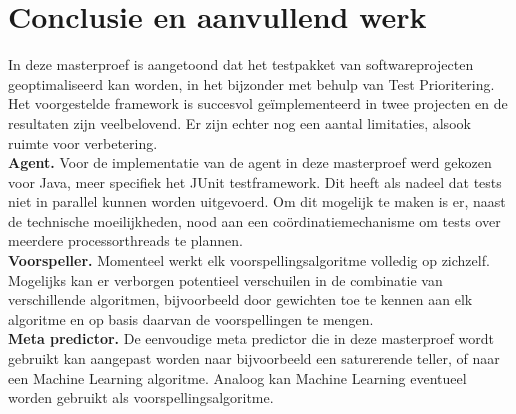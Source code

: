 \section{Conclusie en aanvullend werk}
\noindent In deze masterproef is aangetoond dat het testpakket van softwareprojecten geoptimaliseerd kan worden, in het bijzonder met behulp van Test Prioritering. Het voorgestelde framework is succesvol ge\"implementeerd in twee projecten en de resultaten zijn veelbelovend. Er zijn echter nog een aantal limitaties, alsook ruimte voor verbetering.\\

\noindent \textbf{Agent.}
Voor de implementatie van de agent in deze masterproef werd gekozen voor Java, meer specifiek het JUnit testframework. Dit heeft als nadeel dat tests niet in parallel kunnen worden uitgevoerd. Om dit mogelijk te maken is er, naast de technische moeilijkheden, nood aan een co\"ordinatiemechanisme om tests over meerdere processorthreads te plannen.\\

\noindent \textbf{Voorspeller.}
Momenteel werkt elk voorspellingsalgoritme volledig op zichzelf. Mogelijks kan er verborgen potentieel verschuilen in de combinatie van verschillende algoritmen, bijvoorbeeld door gewichten toe te kennen aan elk algoritme en op basis daarvan de voorspellingen te mengen.\\

\noindent \textbf{Meta predictor.}
De eenvoudige meta predictor die in deze masterproef wordt gebruikt kan aangepast worden naar bijvoorbeeld een saturerende teller, of naar een Machine Learning algoritme. Analoog kan Machine Learning eventueel worden gebruikt als voorspellingsalgoritme.